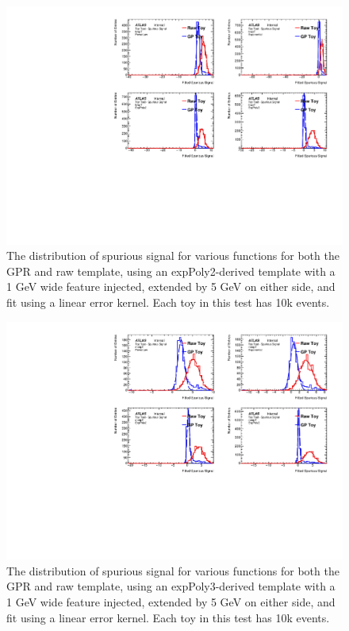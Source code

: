 \begin{figure} 
\begin{center}
  \includegraphics[width=\textwidth]{figures/background/gpr/validation/linear/ToyTest_FitSigVals_lowpT_10k_Sig_1s}   
\caption{The distribution of spurious signal for various functions for both the GPR and raw template, using an expPoly2-derived template with a 1 GeV wide feature injected, extended by 5 GeV on either side, and fit using a linear error kernel. Each toy in this test has 10k events.}
\label{fig:linearkernel_lowpt_10k_Sig_1s}
\end{center}
\end{figure}

\begin{figure} 
\begin{center}
  \includegraphics[width=\textwidth]{figures/background/gpr/validation/linear/ToyTest_FitSigVals_medpT_10k_Sig_1s}   
\caption{The distribution of spurious signal for various functions for both the GPR and raw template, using an expPoly3-derived template with a 1 GeV wide feature injected, extended by 5 GeV on either side, and fit using a linear error kernel. Each toy in this test has 10k events.}
\label{fig:linearkernel_medpt_10k_Sig_1s}
\end{center}
\end{figure}

